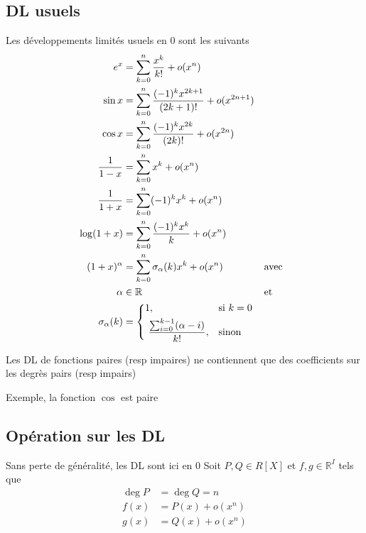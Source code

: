 \documentclass[11pt,colorlinks]{book}
\theoremstyle{mytheoremstyle}
\theoremstyle{mytheoremstyle}
\theoremstyle{mytheoremstyle}
\theoremstyle{mytheoremstyle}
\theoremstyle{mytheoremstyle}
\theoremstyle{mytheoremstyle}
\theoremstyle{mytheoremstyle}
\theoremstyle{mytheoremstyle}
\theoremstyle{myproblemstyle}
\def\mbb#1{\mathbb{#1}}
\def\bR{\mbb{R}}
\begin{document}
  \subsection{DL usuels}
  \begin{prop}
    Les développements limités usuels en 0 sont les suivants
    \begin{align*}
      e^x &= \sum_{k=0}^{n} \dfrac{x^k}{k!} + o(x^n) \\
      \sin x &= \sum_{k=0}^{n} \dfrac{(-1)^{k} x^{2k+1}}{(2k+1)!} + o(x^{2n+1}) \\ 
      \cos x &= \sum_{k=0}^{n} \dfrac{(-1)^{k} x^{2k}}{(2k)!} + o(x^{2n}) \\
      \dfrac{1}{1-x} &= \sum_{k=0}^{n} x^k + o(x^n) \\ 
      \dfrac{1}{1+x} &= \sum_{k=0}^{n} (-1)^k x^k + o(x^n) \\ 
      \log (1+x) &= \sum_{k=0}^n \dfrac{(-1)^k x^k}{k} + o(x^n) \\ 
      (1+x)^{\alpha} &= \sum_{k=0}^{n} \sigma_{\alpha}(k) x^k + o(x^n) && \text{avec} \\
      \alpha &\in \bR && \text{et} \\
      \sigma_{\alpha}(k) &= 
      \begin{dcases}
        1 ,& \text{si } k=0 \\ 
        \dfrac{\sum_{i=0}^{k-1} (\alpha - i)}{k!} ,& \text{sinon}
      \end{dcases}
    \end{align*}
  \end{prop}
  \begin{rmq}
    Les DL de fonctions paires (resp impaires) ne contiennent que des coefficients sur les degrès pairs (resp impairs)
    \begin{ex}
      Exemple, la fonction $\cos$ est paire
    \end{ex}
  \end{rmq}
  \subsection{Opération sur les DL}
  Sans perte de généralité, les DL sont ici en $0$  \newline
  Soit $P,Q \in R[X]$ et $f,g \in \bR^{I}$ tels que 
  \begin{align*}
    \deg P &= \deg Q = n \\ 
    f(x) &= P(x) + o(x^n) \\ 
    g(x) &= Q(x) + o(x^n)
  \end{align*}
\end{document}
